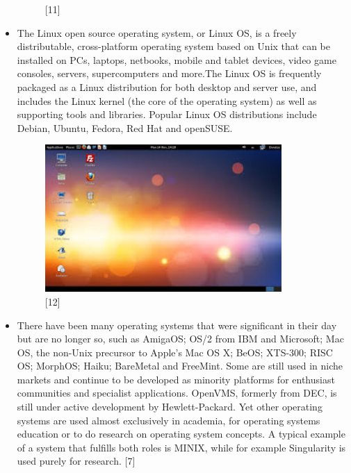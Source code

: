 \documentclass[11pt,a4paper]{article}
\begin{document}
\begin{itemize}
\begin{figure}[h!]
				\centering
				\caption{[11]}
			\end{figure}
		\item The Linux open source operating system, or Linux OS, is a freely distributable, cross-platform operating system based on Unix that can be installed on PCs, laptops, netbooks, mobile and tablet devices, video game consoles, servers, supercomputers and more.The Linux OS is frequently packaged as a Linux distribution for both desktop and server use, and includes the Linux kernel (the core of the operating system) as well as supporting tools and libraries. Popular Linux OS distributions include Debian, Ubuntu, Fedora, Red Hat and openSUSE.
		\newpage
		\begin{figure}[h!]
			\includegraphics[width=9cm]{linux.jpg}
			\centering
			\caption{[12]}
		\end{figure} 
		\item There have been many operating systems that were significant in their day but are no longer so, such as AmigaOS; OS/2 from IBM and Microsoft; Mac OS, the non-Unix precursor to Apple's Mac OS X; BeOS; XTS-300; RISC OS; MorphOS; Haiku; BareMetal and FreeMint. Some are still used in niche markets and continue to be developed as minority platforms for enthusiast communities and specialist applications. OpenVMS, formerly from DEC, is still under active development by Hewlett-Packard. Yet other operating systems are used almost exclusively in academia, for operating systems education or to do research on operating system concepts. A typical example of a system that fulfills both roles is MINIX, while for example Singularity is used purely for research. [7]
	\end{itemize}
	
	\newpage
\end{document}
